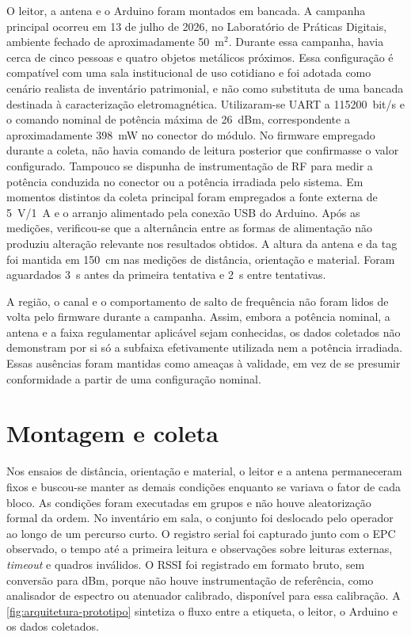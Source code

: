 O leitor, a antena e o Arduino foram montados em bancada. A campanha principal ocorreu em 13 de julho de 2026, no Laboratório de Práticas Digitais, ambiente fechado de aproximadamente 50~m$^2$. Durante essa campanha, havia cerca de cinco pessoas e quatro objetos metálicos próximos. Essa configuração é compatível com uma sala institucional de uso cotidiano e foi adotada como cenário realista de inventário patrimonial, e não como substituta de uma bancada destinada à caracterização eletromagnética. Utilizaram-se UART a 115200~bit/s e o comando nominal de potência máxima de 26~dBm, correspondente a aproximadamente 398~mW no conector do módulo. No firmware empregado durante a coleta, não havia comando de leitura posterior que confirmasse o valor configurado. Tampouco se dispunha de instrumentação de RF para medir a potência conduzida no conector ou a potência irradiada pelo sistema. Em momentos distintos da coleta principal foram empregados a fonte externa de 5~V/1~A e o arranjo alimentado pela conexão USB do Arduino. Após as medições, verificou-se que a alternância entre as formas de alimentação não produziu alteração relevante nos resultados obtidos. A altura da antena e da tag foi mantida em 150~cm nas medições de distância, orientação e material. Foram aguardados 3~s antes da primeira tentativa e 2~s entre tentativas.

A região, o canal e o comportamento de salto de frequência não foram lidos de volta pelo firmware durante a campanha. Assim, embora a potência nominal, a antena e a faixa regulamentar aplicável sejam conhecidas, os dados coletados não demonstram por si só a subfaixa efetivamente utilizada nem a potência irradiada. Essas ausências foram mantidas como ameaças à validade, em vez de se presumir conformidade a partir de uma configuração nominal.

\section{Montagem e coleta}

Nos ensaios de distância, orientação e material, o leitor e a antena permaneceram fixos e buscou-se manter as demais condições enquanto se variava o fator de cada bloco. As condições foram executadas em grupos e não houve aleatorização formal da ordem. No inventário em sala, o conjunto foi deslocado pelo operador ao longo de um percurso curto. O registro serial foi capturado junto com o EPC observado, o tempo até a primeira leitura e observações sobre leituras externas, \textit{timeout} e quadros inválidos. O RSSI foi registrado em formato bruto, sem conversão para dBm, porque não houve instrumentação de referência, como analisador de espectro ou atenuador calibrado, disponível para essa calibração. A \autoref{fig:arquitetura-prototipo} sintetiza o fluxo entre a etiqueta, o leitor, o Arduino e os dados coletados.

